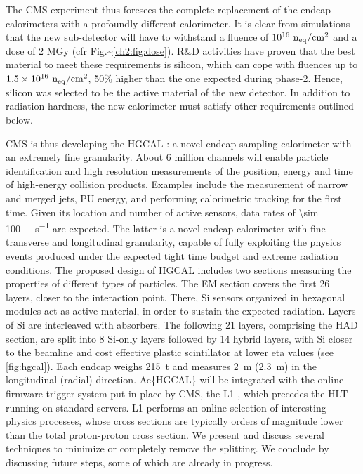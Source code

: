 \documentclass[11pt]{article}
\begin{document}
The CMS experiment thus foresees the complete replacement of the endcap calorimeters with a profoundly different calorimeter. It is clear from simulations that the new sub-detector will have to withstand a fluence of \(10^{16}~\rm n_{eq}/cm^2\) and a dose of 2 MGy (cfr Fig.\textasciitilde{}\cref{ch2:fig:dose}). R\&D activities have proven that the best material to meet these requirements is silicon, which can cope with fluences up to \(1.5\times10^{16}~\rm n_{eq}/cm^2\), 50\% higher than the one expected during phase-2. Hence, silicon was selected to be the active material of the new detector. In addition to radiation hardness, the new calorimeter must satisfy other requirements outlined below.

\Ac{CMS} \cite{cms_collab} is thus developing the \ac{HGCAL} \cite{hgcalTDR}: a novel endcap sampling calorimeter with an extremely fine granularity.
About \num{6} million channels will enable particle identification and high resolution measurements of the position, energy and time of high-energy collision products.
Examples include the measurement of narrow and merged jets, \ac{PU} energy, and performing calorimetric tracking for the first time.
Given its location and number of active sensors, data rates of \SI{\sim 100}{\tera\byte\per\second} are expected.
The latter is a novel endcap calorimeter with fine transverse and longitudinal granularity, capable of fully exploiting the physics events produced under the expected tight time budget and extreme radiation conditions.
The proposed design of \ac{HGCAL} includes two sections measuring the properties of different types of particles.
The \ac{EM} section covers the first 26 layers, closer to the interaction point.
There, \ac{Si} sensors organized in hexagonal modules act as active material, in order to sustain the expected radiation.
Layers of \ac{Si} are interleaved with absorbers.
The following 21 layers, comprising the \ac{HAD} section, are split into 8 \ac{Si}-only layers followed by 14 hybrid layers, with \ac{Si} closer to the beamline and cost effective plastic scintillator at lower \ac{eta} values (see \cref{fig:hgcal}). 
Each endcap weighs \SI{215}{\tonne} and measures \SI{2}{\meter} (\SI{2.3}{\meter}) in the longitudinal (radial) direction.
Ac\{HGCAL\} will be integrated with the online firmware trigger system put in place by \ac{CMS}, the \ac{L1} \cite{l1TDR}, which precedes the \ac{HLT} running on standard servers.
\Ac{L1} performs an online selection of interesting physics processes, whose cross sections are typically orders of magnitude lower than the total proton-proton cross section.
We present and discuss several techniques to minimize or completely remove the splitting.
We conclude by discussing future steps, some of which are already in progress.
\end{document}
